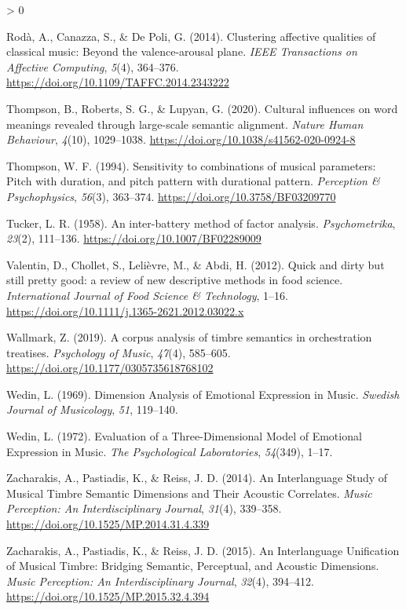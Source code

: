 \documentclass[
  english,
  man,floatsintext]{apa6}
\newlength{\cslhangindent}
\newenvironment{CSLReferences}[2] %
 {%
  \setlength{\parindent}{0pt}
  \ifodd #1 \everypar{\setlength{\hangindent}{\cslhangindent}}\ignorespaces\fi
  \ifnum #2 > 0
  \setlength{\parskip}{#2\baselineskip}
  \fi
 }%
 {}
\begin{document}
\begin{CSLReferences}{1}{0}
\leavevmode\hypertarget{ref-Roda2014}{}%
Rodà, A., Canazza, S., \& De Poli, G. (2014). {Clustering affective qualities of classical music: Beyond the valence-arousal plane}. \emph{IEEE Transactions on Affective Computing}, \emph{5}(4), 364--376. \url{https://doi.org/10.1109/TAFFC.2014.2343222}

\leavevmode\hypertarget{ref-Thompson2020}{}%
Thompson, B., Roberts, S. G., \& Lupyan, G. (2020). {Cultural influences on word meanings revealed through large-scale semantic alignment}. \emph{Nature Human Behaviour}, \emph{4}(10), 1029--1038. \url{https://doi.org/10.1038/s41562-020-0924-8}

\leavevmode\hypertarget{ref-Thompson1994}{}%
Thompson, W. F. (1994). {Sensitivity to combinations of musical parameters: Pitch with duration, and pitch pattern with durational pattern}. \emph{Perception {\&} Psychophysics}, \emph{56}(3), 363--374. \url{https://doi.org/10.3758/BF03209770}

\leavevmode\hypertarget{ref-Tucker1958}{}%
Tucker, L. R. (1958). {An inter-battery method of factor analysis}. \emph{Psychometrika}, \emph{23}(2), 111--136. \url{https://doi.org/10.1007/BF02289009}

\leavevmode\hypertarget{ref-Valentin2012}{}%
Valentin, D., Chollet, S., Lelièvre, M., \& Abdi, H. (2012). {Quick and dirty but still pretty good: a review of new descriptive methods in food science}. \emph{International Journal of Food Science {\&} Technology}, 1--16. \url{https://doi.org/10.1111/j.1365-2621.2012.03022.x}

\leavevmode\hypertarget{ref-Wallmark2019}{}%
Wallmark, Z. (2019). {A corpus analysis of timbre semantics in orchestration treatises}. \emph{Psychology of Music}, \emph{47}(4), 585--605. \url{https://doi.org/10.1177/0305735618768102}

\leavevmode\hypertarget{ref-Wedin1969}{}%
Wedin, L. (1969). {Dimension Analysis of Emotional Expression in Music}. \emph{Swedish Journal of Musicology}, \emph{51}, 119--140.

\leavevmode\hypertarget{ref-Wedin1972}{}%
Wedin, L. (1972). {Evaluation of a Three-Dimensional Model of Emotional Expression in Music}. \emph{The Psychological Laboratories}, \emph{54}(349), 1--17.

\leavevmode\hypertarget{ref-Zacharakis2014}{}%
Zacharakis, A., Pastiadis, K., \& Reiss, J. D. (2014). {An Interlanguage Study of Musical Timbre Semantic Dimensions and Their Acoustic Correlates}. \emph{Music Perception: An Interdisciplinary Journal}, \emph{31}(4), 339--358. \url{https://doi.org/10.1525/MP.2014.31.4.339}

\leavevmode\hypertarget{ref-Zacharakis2015}{}%
Zacharakis, A., Pastiadis, K., \& Reiss, J. D. (2015). {An Interlanguage Unification of Musical Timbre: Bridging Semantic, Perceptual, and Acoustic Dimensions}. \emph{Music Perception: An Interdisciplinary Journal}, \emph{32}(4), 394--412. \url{https://doi.org/10.1525/MP.2015.32.4.394}

\end{CSLReferences}

\endgroup
\end{document}
